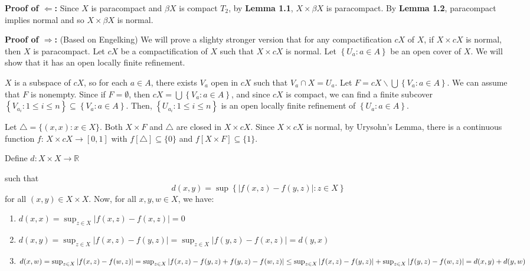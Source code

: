 \documentclass{article}
\begin{document}
\vskip 10pt

\textbf{Proof of $\Leftarrow$:} 
Since $X$ is paracompact and $\beta X$ is compact $T_2$, by \textbf{Lemma 1.1}, $X\times \beta X$ is paracompact. 
By \textbf{Lemma 1.2}, paracompact implies normal and so $X\times \beta X$ is normal. 

\vskip 15pt



\textbf{Proof of $\Rightarrow$: } (Based on Engelking) 
We will prove a slighty stronger version that for any compactification $cX$ of $X$, if $X \times cX$ is normal, 
then $X$ is paracompact. 
\vskip 10pt
Let $cX$ be a compactification of $X$ such that $X \times cX$ is normal. Let 
$\left\{U_a: a \in A\right\}$ be an open cover of $X$. We will show that it has an open locally finite refinement.

\vskip 10pt

$X$ is a subspace of $cX$, so for each $a \in A$, there exists $V_a$ open in $cX$ such that $V_a \cap X = U_a.$ Let $F=cX\backslash \bigcup \left\{V_a: a\in A\right\}$.  We can assume that $F$ is nonempty. Since if $F=\emptyset$, then $cX=\bigcup \left\{V_a: a\in A\right\}$, and since $cX$ is compact, we can find a finite subcover $\left\{V_{a_i}: 1\leq i \leq n\right\}\subseteq \left\{V_a: a\in A\right\}$. Then, $\left\{U_{a_i}: 1\leq i\leq n\right\}$ is an open locally finite refinement of $\left\{U_a: a \in A\right\}$. 
  

\vskip 10pt

Let $\triangle = \{(x,x): x \in X\}.$
Both $X \times F$ and $\triangle$ are closed in $X \times cX $. Since $X \times cX $ is normal, by Urysohn's Lemma, there is 
a continuous function $f$: $X \times cX \rightarrow [0,1]$ with $f[\triangle] \subseteq \{0\}$ and $f[X\times F] \subseteq
 \{1\}$. 
 
\vskip 15pt 

Define $d: X\times X \rightarrow \mathbb{R}$ 



such that $$d(x,y)=\sup \left\{ \left|f(x,z)-f(y,z)\right|: z\in X\right\}$$ for all $(x,y) \in X \times X$. 
Now, for all $x,y,w \in X$, we have: 

\begin{enumerate}
	\item $d(x,x)=\sup_{z\in X} |f(x,z)-f(x,z)|=0$
	\item $d(x,y)=\sup_{z\in X} |f(x,z)-f(y,z)|=\sup_{z\in X} |f(y,z)-f(x,z)|=d(y,x)$
	\item $d(x,w)=\sup_{z\in X} |f(x,z)-f(w,z)|\\
	=\sup_{z\in X} |f(x,z)-f(y,z)+f(y,z)-f(w,z)|\\
	\leq \sup_{z\in X} |f(x,z)-f(y,z)|+\sup_{z\in X} |f(y,z)-f(w,z)|\\
	=d(x,y)+d(y,w)$
\end{enumerate}
\end{document}
